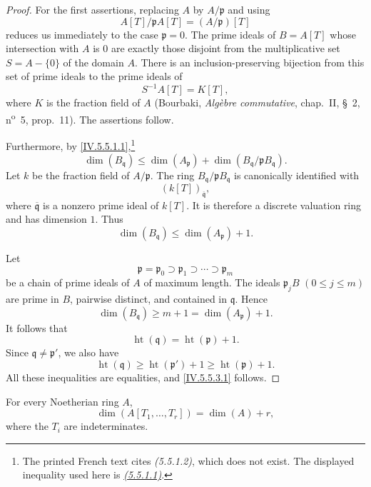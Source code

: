 \begin{proof}
For the first assertions, replacing $A$ by $A/\mathfrak p$ and using
\[
A[T]/\mathfrak pA[T]=(A/\mathfrak p)[T]
\]
reduces us immediately to the case $\mathfrak p=0$.
The prime ideals of $B=A[T]$ whose intersection with $A$ is $0$ are
exactly those disjoint from the multiplicative set
$S=A-\{0\}$ of the domain $A$.
There is an inclusion-preserving bijection from this set of prime
ideals to the prime ideals of
\[
S^{-1}A[T]=K[T],
\]
where $K$ is the fraction field of $A$
(Bourbaki, \emph{Alg\`ebre commutative}, chap.~II, \S~2,
n\textsuperscript{o}~5, prop.~11).
The assertions follow.

Furthermore, by \eqref{IV.5.5.1.1},\footnote{The printed French text
cites \emph{(5.5.1.2)}, which does not exist.  The displayed
inequality used here is \emph{{\hyperlink{ega4.c04.eq.5-5-1-1}{(5.5.1.1)}}}.}
\[
\dim(B_{\mathfrak q})
 \leq\dim(A_{\mathfrak p})
   +\dim(B_{\mathfrak q}/\mathfrak pB_{\mathfrak q}).
\]
Let $k$ be the fraction field of $A/\mathfrak p$.
The ring $B_{\mathfrak q}/\mathfrak pB_{\mathfrak q}$ is canonically
identified with
\[
(k[T])_{\overline{\mathfrak q}},
\]
where $\overline{\mathfrak q}$ is a nonzero prime ideal of $k[T]$.
It is therefore a discrete valuation ring and has dimension $1$.
Thus
\[
\dim(B_{\mathfrak q})\leq\dim(A_{\mathfrak p})+1.
\]

Let
\[
\mathfrak p=\mathfrak p_0
 \supset\mathfrak p_1
 \supset\cdots
 \supset\mathfrak p_m
\]
be a chain of prime ideals of $A$ of maximum length.
The ideals $\mathfrak p_jB$ $(0\leq j\leq m)$ are prime in $B$,
pairwise distinct, and contained in $\mathfrak q$.
Hence
\[
\dim(B_{\mathfrak q})
 \geq m+1
 =\dim(A_{\mathfrak p})+1.
\]
It follows that
\[
\operatorname{ht}(\mathfrak q)
  =\operatorname{ht}(\mathfrak p)+1.
\]
Since $\mathfrak q\neq\mathfrak p'$, we also have
\[
\operatorname{ht}(\mathfrak q)
 \geq\operatorname{ht}(\mathfrak p')+1
 \geq\operatorname{ht}(\mathfrak p)+1.
\]
All these inequalities are equalities, and
\eqref{IV.5.5.3.1} follows.
\end{proof}

\begin{corollary}[5.5.4]
\label{IV.5.5.4}
For every Noetherian ring $A$,
\begin{equation}
\dim(A[T_1,\ldots,T_r])=\dim(A)+r,
\tag{5.5.4.1}\label{IV.5.5.4.1}
\end{equation}
where the $T_i$ are indeterminates.
\end{corollary}

